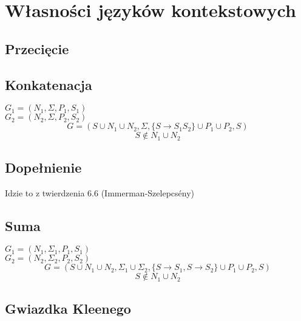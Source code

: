 \section{Własności języków kontekstowych}

\subsection{Przecięcie}

\subsection{Konkatenacja}
\(G_1 = (N_1, \Sigma, P_1, S_1)\) \\
\(G_2 = (N_2, \Sigma, P_2, S_2)\)
\[ G = (S \cup N_1 \cup N_2, \Sigma, \{S \rightarrow S_1S_2\} \cup P_1 \cup P_2, S) 
\]
\[S \notin N_1 \cup N_2 \]

\subsection{Dopełnienie}
Idzie to z twierdzenia 6.6 (Immerman-Szelepcsény)


\subsection{Suma}
\(G_1 = (N_1, \Sigma_1, P_1, S_1)\) \\
\(G_2 = (N_2, \Sigma_2, P_2, S_2)\)
\[ G = (S \cup N_1 \cup N_2, \Sigma_1 \cup \Sigma_2, \{S \rightarrow S_1, S \rightarrow S_2\} \cup P_1 \cup P_2, S) 
\]
\[S \notin N_1 \cup N_2 \]

\subsection{Gwiazdka Kleenego}

